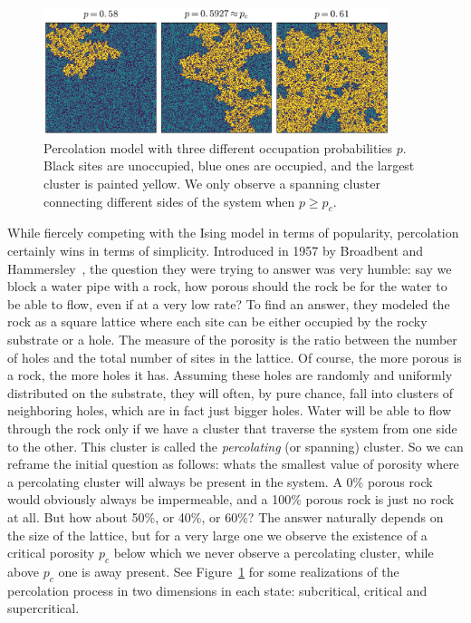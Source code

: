 \begin{figure}[b]
\begin{center}
    \includegraphics[width=0.9\textwidth]{chapters/ch2-crit/figs/isoperco}
\end{center}
\caption{Percolation model with three
    different occupation probabilities $p$. Black sites are unoccupied, blue
    ones are occupied, and the largest cluster is painted yellow. 
    We only observe a spanning cluster connecting different sides of the system
    when $p\geq p_c$.}
\label{fig:isoperco}
\end{figure}

While fiercely competing with the Ising model in terms of popularity,
percolation certainly wins in terms of simplicity. Introduced in 1957 by
Broadbent and Hammersley~\cite{Broadbent1957}, the question they were trying to
answer was very humble: say we block a water pipe with a rock, how porous
should the rock be for the water to be able to flow, even if at a very low
rate? To find an answer, they modeled the rock as a square lattice where each
site can be either occupied by the rocky substrate or a hole. The measure of
the porosity is the ratio between the number of holes and the total number of
sites in the lattice. Of course, the more porous is a rock, the more holes it
has. Assuming these holes are randomly and uniformly distributed on the
substrate, they will often, by pure chance, fall into clusters of neighboring
holes, which are in fact just bigger holes. Water will be able to flow through
the rock only if we have a cluster that traverse the system from one side to
the other. This cluster is called the \textit{percolating} (or spanning)
cluster. So we can reframe the initial question as follows: whats the smallest
value of porosity where a percolating cluster will always be present in the
system. A 0\% porous rock would obviously always be impermeable, and a 100\%
porous rock is just no rock at all. But how about 50\%, or 40\%, or 60\%? The
answer naturally depends on the size of the lattice, but for a very large one
we observe the existence of a critical porosity $p_c$ below which we never
observe a percolating cluster, while above $p_c$ one is away present. See
Figure~\ref{fig:isoperco} for some realizations of the percolation process in
two dimensions in each state: subcritical, critical and supercritical.

